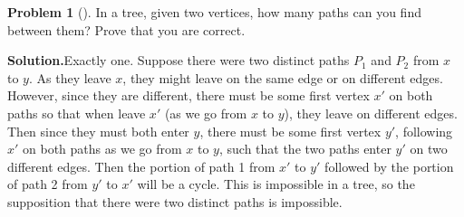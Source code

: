 \documentclass[10pt,]{book}
\theoremstyle{plain}
\theoremstyle{definition}
\newtheorem{activity}[project]{Problem}
\theoremstyle{definition}
\numberwithin{equation}{chapter}
\begin{document}
\begin{activity}[]\label{activity-110}
In a tree, given two vertices, how many paths can you find between them? Prove that you are correct.%
\par\medskip\noindent%
\textbf{Solution.}\quad Exactly one. Suppose there were two distinct paths \(P_1\) and \(P_2\) from \(x\) to \(y\). As they leave \(x\), they might leave on the same edge or on different edges. However, since they are different, there must be some first vertex \(x'\) on both paths so that when leave \(x'\) (as we go from \(x\) to \(y\)), they leave on different edges. Then since they must both enter \(y\), there must be some first vertex \(y'\), following \(x'\) on both paths as we go from \(x\) to \(y\), such that the two paths enter \(y'\) on two different edges. Then the portion of path 1 from \(x'\) to \(y'\) followed by the portion of path 2 from \(y'\) to \(x'\) will be a cycle. This is impossible in a tree, so the supposition that there were two distinct paths is impossible.%
\end{activity}
\end{document}
